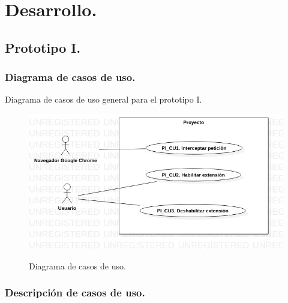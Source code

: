 \documentclass[12pt, a4paper, titlepage]{article}
\begin{document}
	\section{\textcolor{azulescom}{Desarrollo.}}
		\subsection{Prototipo I.}
			\subsubsection{Diagrama de casos de uso.}

				Diagrama de casos de uso general para el prototipo I.
				\begin{figure}[htb]
					\begin{center}
						\label{fig1} 
						\includegraphics[width=17cm]{./imagenes/UCD_1.jpg}
						\caption{Diagrama de casos de uso.}
					\end{center}
				\end{figure}\newpage	
					
			\subsubsection{Descripción de casos de uso.}
			
\end{document}
